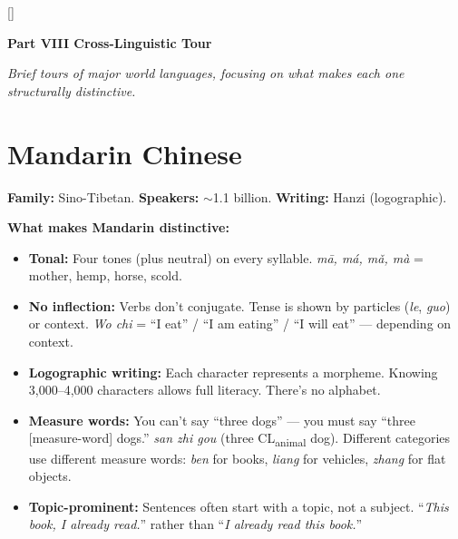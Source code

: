 \documentclass[11pt, letterpaper]{article}
\newcommand{\brownsections}{%
  \titleformat{\section}{\large\bfseries\color{sectionbrown}}{}{0em}{}[\color{sectionbrown}\titlerule]%
  \titleformat{\subsection}{\normalsize\bfseries\color{sectionbrown!80!black}}{}{0em}{}%
}
\newcommand{\partbanner}[3]{%
  \begin{tcolorbox}[colback=#1, colframe=#2, boxrule=1.2pt, arc=4pt,
    left=8pt, right=8pt, top=6pt, bottom=6pt]
    \begin{center}{\LARGE\bfseries #3}\end{center}
  \end{tcolorbox}%
}
\begin{document}
\newpage

\brownsections
{}
\partbanner{part8bg}{sectionbrown}{Part VIII \quad Cross-Linguistic Tour}

\vspace{6pt}
\begin{center}\small\itshape
  Brief tours of major world languages, focusing on what makes each one structurally distinctive.
\end{center}

\section*{Mandarin Chinese}

\textbf{Family:} Sino-Tibetan. \textbf{Speakers:} $\sim$1.1 billion. \textbf{Writing:} Hanzi (logographic).

\textbf{What makes Mandarin distinctive:}
\begin{itemize}[noitemsep]
  \item \textbf{Tonal:} Four tones (plus neutral) on every syllable. \emph{m\=a, m\'a, m\v{a}, m\`a} = mother, hemp, horse, scold.
  \item \textbf{No inflection:} Verbs don't conjugate. Tense is shown by particles (\emph{le}, \emph{guo}) or context. \emph{Wo chi} = ``I eat'' / ``I am eating'' / ``I will eat'' --- depending on context.
  \item \textbf{Logographic writing:} Each character represents a morpheme. Knowing 3{,}000--4{,}000 characters allows full literacy. There's no alphabet.
  \item \textbf{Measure words:} You can't say ``three dogs'' --- you must say ``three [measure-word] dogs.'' \emph{san zhi gou} (three CL\textsubscript{animal} dog). Different categories use different measure words: \emph{ben} for books, \emph{liang} for vehicles, \emph{zhang} for flat objects.
  \item \textbf{Topic-prominent:} Sentences often start with a topic, not a subject. ``\emph{This book, I already read.}'' rather than ``\emph{I already read this book.}''
\end{itemize}
\end{document}
